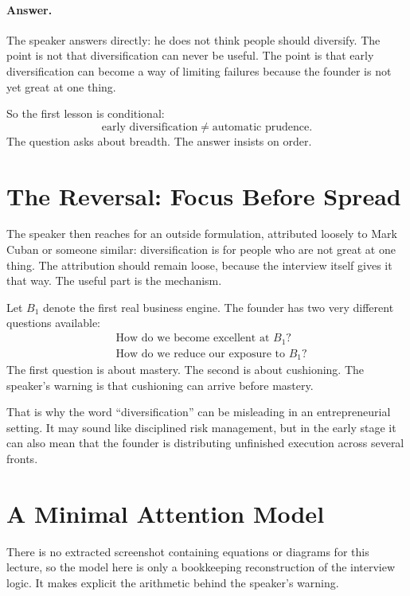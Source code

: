 \paragraph{Answer.}
The speaker answers directly: he does not think people should diversify. The point is not that diversification can never be useful. The point is that early diversification can become a way of limiting failures because the founder is not yet great at one thing.

So the first lesson is conditional:
\begin{equation}
\text{early diversification}
\neq
\text{automatic prudence}.
\end{equation}
The question asks about breadth. The answer insists on order.

\section{The Reversal: Focus Before Spread}

The speaker then reaches for an outside formulation, attributed loosely to Mark Cuban or someone similar: diversification is for people who are not great at one thing. The attribution should remain loose, because the interview itself gives it that way. The useful part is the mechanism.

Let \(B_1\) denote the first real business engine. The founder has two very different questions available:
\begin{align}
&\text{How do we become excellent at } B_1? \\
&\text{How do we reduce our exposure to } B_1?
\end{align}
The first question is about mastery. The second is about cushioning. The speaker's warning is that cushioning can arrive before mastery.

That is why the word ``diversification'' can be misleading in an entrepreneurial setting. It may sound like disciplined risk management, but in the early stage it can also mean that the founder is distributing unfinished execution across several fronts.

\section{A Minimal Attention Model}

There is no extracted screenshot containing equations or diagrams for this lecture, so the model here is only a bookkeeping reconstruction of the interview logic. It makes explicit the arithmetic behind the speaker's warning.

